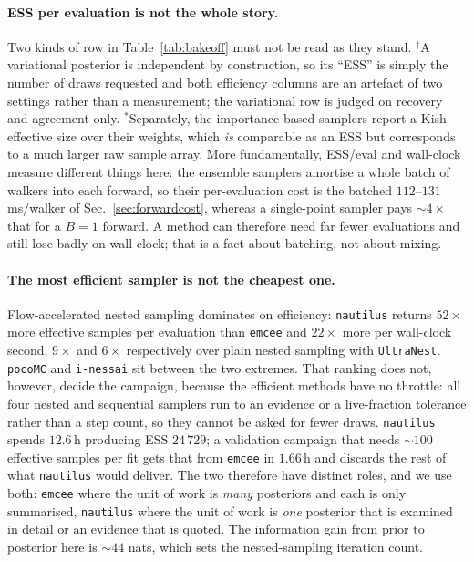 \documentclass[11pt,a4paper]{article}
\newcommand{\code}[1]{\texttt{#1}}
\begin{document}
\paragraph{ESS per evaluation is not the whole story.} Two kinds of row in
Table~\ref{tab:bakeoff} must not be read as they stand. $^\dagger$A variational
posterior is independent by construction, so its ``ESS'' is simply the number of
draws requested and both efficiency columns are an artefact of two settings
rather than a measurement; the variational row is judged on recovery and
agreement only. $^{*}$Separately, the importance-based samplers report a Kish
effective size over their weights, which \emph{is} comparable as an ESS but
corresponds to a much larger raw sample array. More fundamentally, ESS/eval and wall-clock measure
different things here: the ensemble samplers amortise a whole batch of walkers
into each forward, so their per-evaluation cost is the batched
$112$--$131\,$ms/walker of Sec.~\ref{sec:forwardcost}, whereas a single-point
sampler pays ${\sim}4\times$ that for a $B{=}1$ forward. A method can therefore
need far fewer evaluations and still lose badly on wall-clock; that is a fact
about batching, not about mixing.

\paragraph{The most efficient sampler is not the cheapest one.} Flow-accelerated
nested sampling dominates on efficiency: \code{nautilus} returns $52\times$ more
effective samples per evaluation than \code{emcee} and $22\times$ more per
wall-clock second, $9\times$ and $6\times$ respectively over plain nested
sampling with \code{UltraNest}. \code{pocoMC} and \code{i-nessai} sit between the
two extremes. That ranking does not, however, decide the campaign, because the
efficient methods have no throttle: all four nested and sequential samplers run
to an evidence or a live-fraction tolerance rather than a step count, so they
cannot be asked for fewer draws. \code{nautilus} spends $12.6\,$h producing ESS
$24\,729$; a validation campaign that needs ${\sim}100$ effective samples per
fit gets that from \code{emcee} in $1.66\,$h and discards the rest of what
\code{nautilus} would deliver. The two therefore have distinct roles, and we use
both: \code{emcee} where the unit of work is \emph{many} posteriors and each is
only summarised, \code{nautilus} where the unit of work is \emph{one} posterior
that is examined in detail or an evidence that is quoted. The information gain
from prior to posterior here is ${\sim}44$ nats, which sets the
nested-sampling iteration count.
\end{document}
